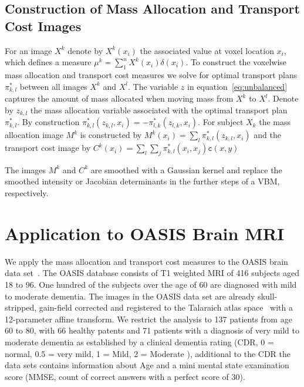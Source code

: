 \documentclass{llncs}
\newcommand{\cost}[0]{\mathtt{c}}
\newcommand{\coupling}[0]{\pi}
\begin{document}
\subsection{Construction of Mass Allocation and Transport Cost Images}
\label{sec:mass}
For an image $X^k$ denote by $X^k(x_i)$ the associated value at voxel location
$x_i$, which defines a measure $\mu^k = \sum_1^n X^k(x_i) \delta(x_i)$.
To construct the voxelwise mass allocation and transport cost measures we solve
for optimal transport plans $\coupling^*_{k,l}$ between all images $X^k$ and $X^l$.  
The variable $z$ in equation~\ref{eq:unbalanced} captures the amount of mass
allocated when moving mass from $X^k$ to $X^l$. Denote by $z_{k, l}$ the mass
allocation variable associated with the optimal transport plan
$\coupling^*_{k,l}$.  By construction $\coupling^*_{k,l}(z_{k,l}, x_i) =
-\coupling^*_{l,k}(z_{l,k}, x_i)$.  For
subject $X_k$ the mass allocation image $M^k$ is constructed by
$M^k(x_i) = \sum_l \coupling^*_{k,l}( z_{k, l}, x_i )$ and the transport cost image by
$C^k(x_i) = \sum_l \sum_j \coupling^*_{k,l}( x_i, x_j ) \cost(x, y)$


The images $M^k$ and $C^k$ are smoothed with a Gaussian kernel and replace the
smoothed intensity or Jacobian determinants in the further steps of a VBM,
respectively. 


\section{Application to OASIS Brain MRI}
We apply the mass allocation and transport cost measures to the OASIS brain
data set~\cite{marcus2010open}.  The OASIS database consists of T1 weighted
MRI of 416 subjects aged 18 to 96. One hundred of the subjects over the age of
60 are diagnosed with mild to moderate dementia. The images in the OASIS data
set are already skull-stripped, gain-field corrected and registered to the
Talaraich atlas space~\cite{talaraich:book88} with a 12-parameter affine
transform.  We restrict the analysis to 137 patients from age 60 to 80, with 66
healthy patents and 71 patients with a diagnosis of very mild to moderate
dementia as established by a clinical dementia rating (CDR, 0 = normal, 0.5 =
very mild, 1 = Mild, 2 = Moderate ), additional to the CDR the data sets
contains information about Age and a mini mental state examination score (MMSE,
count of correct answers with a perfect score of 30).
\end{document}
